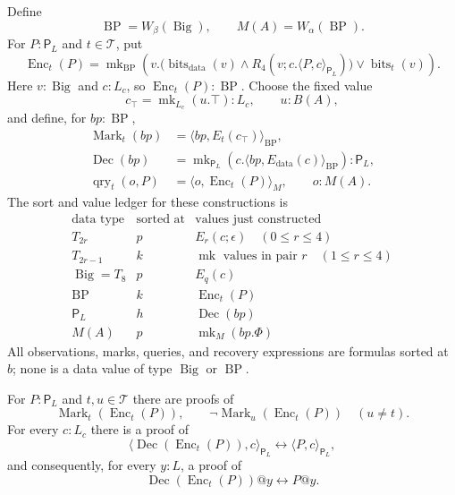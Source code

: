 Define
\[
 \operatorname{BP}=W_{\beta}(\operatorname{Big}),\qquad
 M(A)=W_{\alpha}(\operatorname{BP}).
\]
For $P:\mathsf P_L$ and $t\in\mathcal T$, put
\begin{equation}
 \operatorname{Enc}_t(P)=\operatorname{mk}_{\operatorname{BP}}\left(
 v.\bigl(\operatorname{bits}_{\mathrm{data}}(v)
        \land R_4(v;c.\langle P,c\rangle_{\mathsf P_L})\bigr)
        \lor\operatorname{bits}_{t}(v)\right).
\label{chan-enc}
\end{equation}
Here $v:\operatorname{Big}$ and $c:L_c$, so
$\operatorname{Enc}_t(P):\operatorname{BP}$.  Choose the fixed value
\[
 c_\top=\operatorname{mk}_{L_c}(u.\top):L_c,
 \qquad u:B(A),
\]
and define, for $bp:\operatorname{BP}$,
\[
\begin{aligned}
 \operatorname{Mark}_t(bp)
    &=\langle bp,E_t(c_\top)\rangle_{\operatorname{BP}},\\
 \operatorname{Dec}(bp)
    &=\operatorname{mk}_{\mathsf P_L}
                  (c.\langle bp,E_{\mathrm{data}}(c)\rangle_{\operatorname{BP}})
                    :\mathsf P_L,\\
 \operatorname{qry}_t(o,P)
    &=\langle o,\operatorname{Enc}_t(P)\rangle_M,
                      \qquad o:M(A).
\end{aligned}
\]
The sort and value ledger for these constructions is
\[
\begin{array}{c|c|l}
\text{data type}&\text{sorted at}&\text{values just constructed}\\ \hline
T_{2r}&p&E_r(c;\epsilon)\quad(0\le r\le4)\\
T_{2r-1}&k&\operatorname{mk}\text{ values in pair }r\quad(1\le r\le4)\\
\operatorname{Big}=T_8&p&E_q(c)\\
\operatorname{BP}&k&\operatorname{Enc}_t(P)\\
\mathsf P_L&h&\operatorname{Dec}(bp)\\
M(A)&p&\operatorname{mk}_M(bp.\Phi)
\end{array}
\]
All observations, marks, queries, and recovery expressions are formulas
sorted at $b$; none is a data value of type $\operatorname{Big}$ or
$\operatorname{BP}$.

\begin{lemma}
\label{chan-marker-laws}
For $P:\mathsf P_L$ and $t,u\in\mathcal T$ there are proofs of
\[
 \operatorname{Mark}_t(\operatorname{Enc}_t(P)),\qquad
 \neg\operatorname{Mark}_u(\operatorname{Enc}_t(P))\quad(u\ne t).
\]
For every $c:L_c$ there is a proof of
\[
 \langle\operatorname{Dec}(\operatorname{Enc}_t(P)),c\rangle_{\mathsf P_L}
       \leftrightarrow\langle P,c\rangle_{\mathsf P_L},
\]
and consequently, for every $y:L$, a proof of
\begin{equation}
 \operatorname{Dec}(\operatorname{Enc}_t(P))@y\leftrightarrow P@y.
\label{chan-decode}
\end{equation}
\end{lemma}

